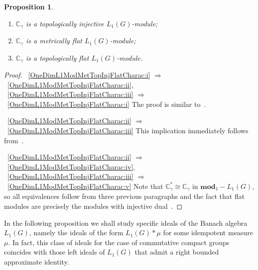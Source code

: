 \documentclass{article}
\theoremstyle{plain}
\newtheorem{proposition}{Proposition}[section]
\theoremstyle{definition}
\newtheorem{proof}{Proof}\def\theproof{}
\newcommand{\convol}{\ast}
\newcommand{\isom}{\mathop{\mathbin{\cong}}}
\begin{document}
\begin{fulltext}
\begin{proposition}
\begin{enumerate}[label = (\roman*)]
    \item $\mathbb{C}_\gamma$ is a topologically injective 
    $L_1(G)$-module;\label{OneDimL1ModMetTopInjFlatCharac:iii}
 
    \item $\mathbb{C}_\gamma$ is a metrically flat 
    $L_1(G)$-module;\label{OneDimL1ModMetTopInjFlatCharac:iv}
 
    \item $\mathbb{C}_\gamma$ is a topologically flat 
    $L_1(G)$-module.\label{OneDimL1ModMetTopInjFlatCharac:v}
\end{enumerate}
\end{proposition}
\begin{proof} 
~\ref{OneDimL1ModMetTopInjFlatCharac:i}
$\Longrightarrow$~\ref{OneDimL1ModMetTopInjFlatCharac:ii},
~\ref{OneDimL1ModMetTopInjFlatCharac:iii}
$\Longrightarrow$~\ref{OneDimL1ModMetTopInjFlatCharac:i} 
The proof is similar to~\cite[theorem 4.5]{GravInjProjBanMod}.

~\ref{OneDimL1ModMetTopInjFlatCharac:ii}
$\Longrightarrow$~\ref{OneDimL1ModMetTopInjFlatCharac:iii} This implication
immediately follows from~\cite[proposition 2.14]{NemGeomProjInjFlatBanMod}.

~\ref{OneDimL1ModMetTopInjFlatCharac:ii}
$\Longrightarrow$~\ref{OneDimL1ModMetTopInjFlatCharac:iv},
~\ref{OneDimL1ModMetTopInjFlatCharac:iii}
$\Longrightarrow$~\ref{OneDimL1ModMetTopInjFlatCharac:v} Note that
$\mathbb{C}_\gamma^*\isom \mathbb{C}_\gamma$ in $\mathbf{mod}_1-L_1(G)$, so all
equivalences follow from three previous paragraphs and the fact that flat
modules are precisely the modules with injective dual~\cite[proposition
2.21]{NemGeomProjInjFlatBanMod}.
\end{proof}

In the following proposition we shall study specific ideals of the Banach
algebra $L_1(G)$, namely the ideals of the form $L_1(G)\convol\mu$ for some
idempotent measure $\mu$. In fact, this class of ideals for the case of
commutative compact groups coincides with those left ideals of $L_1(G)$ that
admit a right bounded approximate identity.


\end{fulltext}
\end{document}
